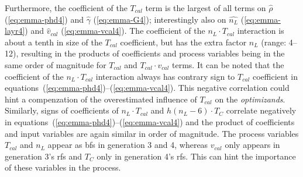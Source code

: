 %
Furthermore, the coefficient of the $T_{cal}$ term is the largest of all terms on $\hat{\rho}$ (\ref{eq:emma-phd4}) and $\hat{\gamma}$ (\ref{eq:emma-G4}); interestingly also on $\hat{n_L}$ (\ref{eq:emma-layr4}) and $\hat{v}_{cal}$ (\ref{eq:emma-vcal4}).
The coefficient of the $n_L\cdot T_{cal}$ interaction is about a tenth in size of the $T_{cal}$ coefficient, 
but has the extra factor $n_L$ (range: 4--12), resulting in the products of coefficients and process variables being in the same order of magnitude for $T_{cal}$ and $T_{cal}\cdot v_{cal}$ terms.
It can be noted that the coefficient of the $n_L\cdot T_{cal}$ interaction always has contrary sign to $T_{cal}$ coefficient in equations~(\ref{eq:emma-phd4})--(\ref{eq:emma-vcal4}). 
This negative correlation could hint a compenzation of the overestimated influence of $T_{cal}$ on the \textit{optimizands}.
Similarly, signs of coefficients of $n_L \cdot T_{cal}$ and $h(n_L -6) \cdot T_{C}$ correlate negatively in equations~(\ref{eq:emma-phd4})--(\ref{eq:emma-vcal4}) and the product of coefficients and input variables are again similar in order of magnitude. 
%
The process variables $T_{cal}$ and $n_L$ appear as \gls{bf}s in generation 3 and 4, whereas $v_{cal}$ only appears in generation 3's \gls{rf}s and $T_{C}$ only in generation 4's \gls{rf}s.
This can hint the importance of these variables in the process. 


